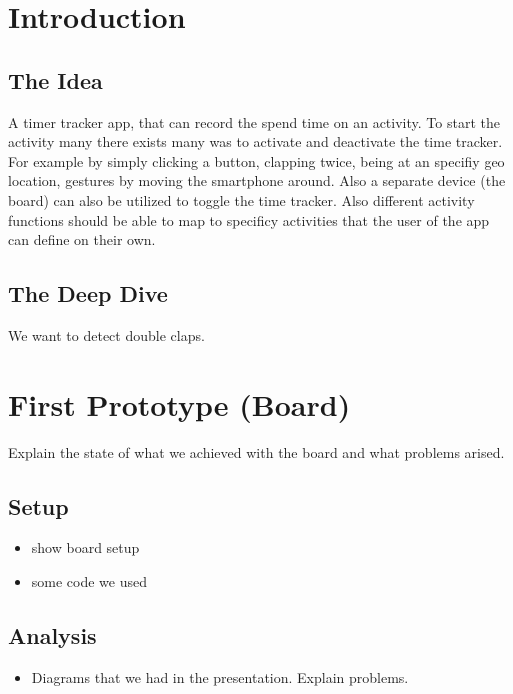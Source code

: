 \documentclass
[
 12pt, %
       DIV12,
       a4paper,
       oneside,
       titlepage,
       parskip=half,
       headings=normal,
       listof=totoc,
       bibliography=totoc,
       index=totoc,
       captions=tableheading,
       ]{scrreprt}
\author{Dennis Müller}
\date{\today}
\title{}
\begin{document}
\tableofcontents


\chapter{Introduction}
\label{sec:org9d46027}

\section{The Idea}
\label{sec:orgb55156f}
A timer tracker app, that can record the spend time on an activity.
To start the activity many there exists many was to activate and deactivate the
time tracker. For example by simply clicking a button, clapping twice, being at
an specifiy geo location, gestures by moving the smartphone around.
Also a separate device (the board) can also be utilized to toggle the time tracker.
Also different activity functions should be able to map to specificy activities
that the user of the app can define on their own.

\section{The Deep Dive}
\label{sec:org697384d}
We want to detect double claps.




\chapter{First Prototype (Board)}
\label{sec:org47f91d8}
Explain the state of what we achieved with the board and what problems arised.
\section{Setup}
\label{sec:orge38cbbc}
\begin{itemize}
\item show board setup
\item some code we used
\end{itemize}



\section{Analysis}
\label{sec:org3a095f8}
\begin{itemize}
\item Diagrams that we had in the presentation. Explain problems.
\end{itemize}
\end{document}
